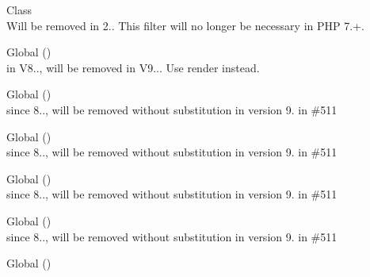 \begin{DoxyRefList}
\item[Class \doxylink{class_deep_copy_1_1_type_filter_1_1_date_1_1_date_interval_filter}{Date\+Interval\+Filter} ]\hfill \\
\label{deprecated__deprecated000190}%
%
Will be removed in 2.. This filter will no longer be necessary in PHP 7.+.  
\item[Global \doxylink{class_sabberworm_1_1_c_s_s_1_1_rule_set_1_1_declaration_block_a7516ca30af0db3cdbf9a7739b48ce91d}{Declaration\+Block\+::\+\_\+\+\_\+to\+String} ()]\hfill \\
\label{deprecated__deprecated000420}%
%
in V8.., will be removed in V9... Use {\ttfamily render} instead.  
\item[Global \doxylink{class_sabberworm_1_1_c_s_s_1_1_rule_set_1_1_declaration_block_a21f6ea9b3dad93dd5ed4b6cfd434eb57}{Declaration\+Block\+::create\+Background\+Shorthand} ()]\hfill \\
\label{deprecated__deprecated000415}%
%
since 8.., will be removed without substitution in version 9. in \#511  
\item[Global \doxylink{class_sabberworm_1_1_c_s_s_1_1_rule_set_1_1_declaration_block_a4e9f90d5de60211f6bef2a1152a32e7d}{Declaration\+Block\+::create\+Border\+Shorthand} ()]\hfill \\
\label{deprecated__deprecated000417}%
%
since 8.., will be removed without substitution in version 9. in \#511  
\item[Global \doxylink{class_sabberworm_1_1_c_s_s_1_1_rule_set_1_1_declaration_block_a15605328867192cd9a6a7ed1c19fd05a}{Declaration\+Block\+::create\+Dimensions\+Shorthand} ()]\hfill \\
\label{deprecated__deprecated000418}%
%
since 8.., will be removed without substitution in version 9. in \#511  
\item[Global \doxylink{class_sabberworm_1_1_c_s_s_1_1_rule_set_1_1_declaration_block_a9957285c5dd0d6372e958d4b35f9ffcf}{Declaration\+Block\+::create\+Font\+Shorthand} ()]\hfill \\
\label{deprecated__deprecated000419}%
%
since 8.., will be removed without substitution in version 9. in \#511  
\item[Global \doxylink{class_sabberworm_1_1_c_s_s_1_1_rule_set_1_1_declaration_block_a6aabd97fa862b242b48ef4262b10d63a}{Declaration\+Block\+::create\+List\+Style\+Shorthand} ()]\hfill \\

\end{DoxyRefList}
